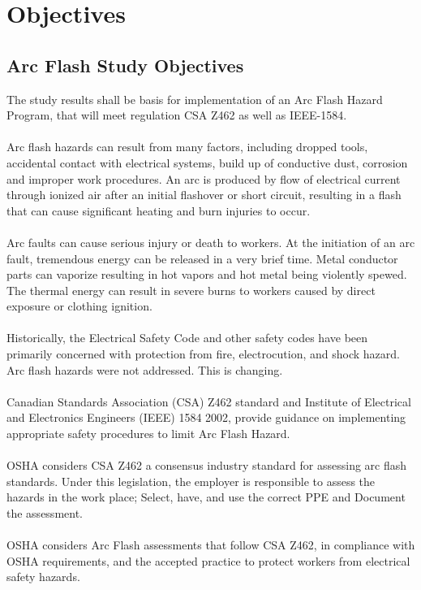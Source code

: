 \section{Objectives}
\label{af:o}

\subsection{Arc Flash Study Objectives}
\label{af:o:afso}

The study results shall be basis for implementation of an Arc Flash Hazard Program, that will meet regulation CSA Z462 as well as IEEE-1584.
\\
\\
Arc flash hazards can result from many factors, including dropped tools, accidental contact with electrical systems, build up of conductive dust, corrosion and improper work procedures. An arc is produced by flow of electrical current through ionized air after an initial flashover or short circuit, resulting in a flash that can cause significant heating and burn injuries to occur. 
\\
\\
Arc faults can cause serious injury or death to workers. At the initiation of an arc fault, tremendous energy can be released in a very brief time. Metal conductor parts can vaporize resulting in hot vapors and hot metal being violently spewed. The thermal energy can result in severe burns to workers caused by direct
exposure or clothing ignition.
\\
\\
Historically, the Electrical Safety Code and other safety codes have been primarily concerned with protection from fire, electrocution, and shock hazard.  Arc flash hazards were not addressed. This is changing.
\\
\\
Canadian Standards Association (CSA) Z462 standard and Institute of Electrical and Electronics Engineers (IEEE) 1584 2002, provide guidance on implementing appropriate safety procedures to limit Arc Flash Hazard.
\\
\\
OSHA considers CSA Z462 a consensus industry standard for assessing arc flash standards. Under this legislation, the employer is responsible to assess the hazards in the work place; Select, have, and use the correct PPE and Document the assessment.
\\
\\
OSHA considers Arc Flash assessments that follow CSA Z462, in compliance with OSHA requirements, and the accepted practice to protect workers from electrical safety hazards.
